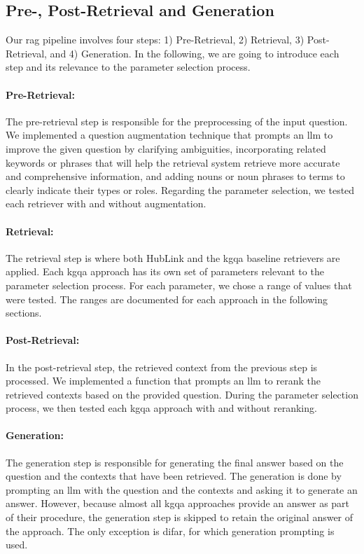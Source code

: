 \subsection{Pre-, Post-Retrieval and Generation}
\label{sec:selection_planning_steps}

Our \gls{rag} pipeline involves four steps: 1) Pre-Retrieval, 2) Retrieval, 3) Post-Retrieval, and 4) Generation. In the following, we are going to introduce each step and its relevance to the parameter selection process.

\paragraph{Pre-Retrieval:} The pre-retrieval step is responsible for the preprocessing of the input question. We implemented a question augmentation technique that prompts an \gls{llm} to improve the given question by clarifying ambiguities, incorporating related keywords or phrases that will help the retrieval system retrieve more accurate and comprehensive information, and adding nouns or noun phrases to terms to clearly indicate their types or roles. Regarding the parameter selection, we tested each retriever with and without augmentation.

\paragraph{Retrieval:} The retrieval step is where both HubLink and the \gls{kgqa} baseline retrievers are applied. Each \gls{kgqa} approach has its own set of parameters relevant to the parameter selection process. For each parameter, we chose a range of values that were tested. The ranges are documented for each approach in the following sections.

\paragraph{Post-Retrieval:} In the post-retrieval step, the retrieved context from the previous step is processed. We implemented a function that prompts an \gls{llm} to rerank the retrieved contexts based on the provided question. During the parameter selection process, we then tested each \gls{kgqa} approach with and without reranking.

\paragraph{Generation:} The generation step is responsible for generating the final answer based on the question and the contexts that have been retrieved. The generation is done by prompting an \gls{llm} with the question and the contexts and asking it to generate an answer. However, because almost all \gls{kgqa} approaches provide an answer as part of their procedure, the generation step is skipped to retain the original answer of the approach. The only exception is \gls{difar}, for which generation prompting is used.

